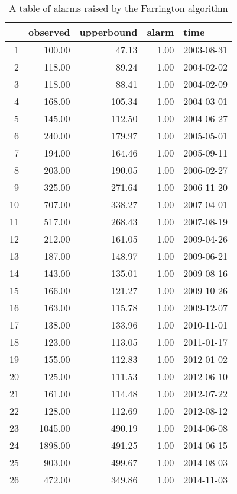 \begin{table}[ht]
 \begin{adjustwidth}{-2cm}{}
\begin{tabular}{rrrrl}
  \hline
 & observed & upperbound & alarm & time \\ 
  \hline
1 & 100.00 & 47.13 & 1.00 & 2003-08-31 \\ 
  2 & 118.00 & 89.24 & 1.00 & 2004-02-02 \\ 
  3 & 118.00 & 88.41 & 1.00 & 2004-02-09 \\ 
  4 & 168.00 & 105.34 & 1.00 & 2004-03-01 \\ 
  5 & 145.00 & 112.50 & 1.00 & 2004-06-27 \\ 
  6 & 240.00 & 179.97 & 1.00 & 2005-05-01 \\ 
  7 & 194.00 & 164.46 & 1.00 & 2005-09-11 \\ 
  8 & 203.00 & 190.05 & 1.00 & 2006-02-27 \\ 
  9 & 325.00 & 271.64 & 1.00 & 2006-11-20 \\ 
  10 & 707.00 & 338.27 & 1.00 & 2007-04-01 \\ 
  11 & 517.00 & 268.43 & 1.00 & 2007-08-19 \\ 
  12 & 212.00 & 161.05 & 1.00 & 2009-04-26 \\ 
  13 & 187.00 & 148.97 & 1.00 & 2009-06-21 \\ 
  14 & 143.00 & 135.01 & 1.00 & 2009-08-16 \\ 
  15 & 166.00 & 121.27 & 1.00 & 2009-10-26 \\ 
  16 & 163.00 & 115.78 & 1.00 & 2009-12-07 \\ 
  17 & 138.00 & 133.96 & 1.00 & 2010-11-01 \\ 
  18 & 123.00 & 113.05 & 1.00 & 2011-01-17 \\ 
  19 & 155.00 & 112.83 & 1.00 & 2012-01-02 \\ 
  20 & 125.00 & 111.53 & 1.00 & 2012-06-10 \\ 
  21 & 161.00 & 114.48 & 1.00 & 2012-07-22 \\ 
  22 & 128.00 & 112.69 & 1.00 & 2012-08-12 \\ 
  23 & 1045.00 & 490.19 & 1.00 & 2014-06-08 \\ 
  24 & 1898.00 & 491.25 & 1.00 & 2014-06-15 \\ 
  25 & 903.00 & 499.67 & 1.00 & 2014-08-03 \\ 
  26 & 472.00 & 349.86 & 1.00 & 2014-11-03 \\ 
   \hline
\end{tabular}
\caption{A table of alarms raised by the Farrington algorithm}
\end{adjustwidth}
\label{tab:tseriesfarringtontable}
\end{table}

